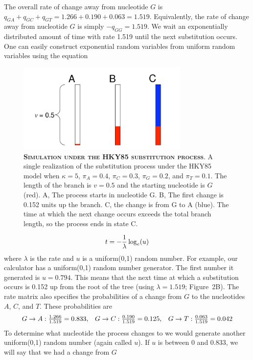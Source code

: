 \documentclass{svmult}
\begin{document}
The overall rate of change away from nucleotide $G$ is $q_{GA} + q_{GC} + q_{GT} = 1.266 + 0.190 +
0.063 = 1.519$.  Equivalently, the rate of change away from nucleotide $G$ is simply $-q_{GG} =
1.519$. We wait an exponentially distributed amount of time with rate 1.519 until the next
substitution occurs. One can easily construct exponential random variables from uniform random
variables using the equation
\begin{figure}[t]
\centering
\includegraphics[height=1.75in]{fig2}

\caption{\textbf{\textsc{Simulation under the HKY85 substitution process}}.
A single realization of the substitution process under the HKY85 model when $\kappa = 5$, $\pi_A =
0.4$, $\pi_C = 0.3$, $\pi_G = 0.2$, and $\pi_T = 0.1$. The length of the branch is $v = 0.5$
and the starting nucleotide is $G$ (red). A, The process starts in nucleotide G. B, The first
change is 0.152 units up the branch. C, the change is from G to A (blue). The time at which the
next change occurs exceeds the total branch length, so the process ends in state C. }
\label{fig2}
\end{figure}
$$
t = -{1 \over \lambda} \log_e(u)
$$
where $\lambda$ is the rate and $u$ is a uniform(0,1) random number. For example, our calculator
has a uniform(0,1) random number generator.  The first number it generated is $u = 0.794$. This
means that the next time at which a substitution occurs is 0.152 up from the root of the tree
(using $\lambda = 1.519$; Figure~2B). The rate matrix also specifies the probabilities of a change
from $G$ to the nucleotides $A$, $C$, and $T$.  These probabilities are
$$
\begin{array}{ccc}
G \rightarrow A: {1.266\over 1.519}=0.833, &  G \rightarrow C: {0.190\over 1.519}=0.125, & G \rightarrow T: {0.063 \over 1.519}=0.042 \\
\end{array} 
$$
To determine what nucleotide the process changes to we would generate another uniform(0,1) random
number (again called $u$). If $u$ is between 0 and 0.833, we will say that we had a change from $G$
\end{document}

